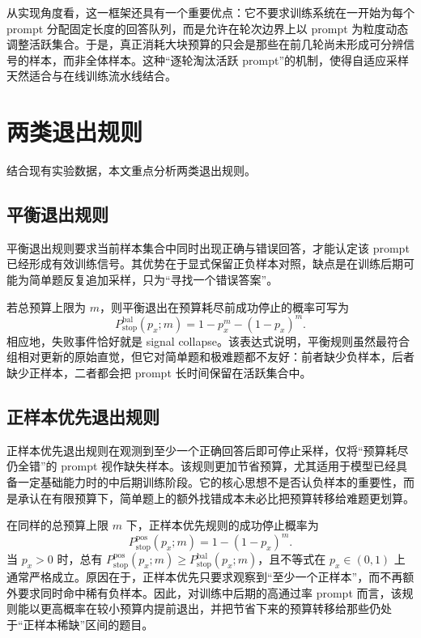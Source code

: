 从实现角度看，这一框架还具有一个重要优点：它不要求训练系统在一开始为每个 prompt 分配固定长度的回答队列，而是允许在轮次边界上以 prompt 为粒度动态调整活跃集合。于是，真正消耗大块预算的只会是那些在前几轮尚未形成可分辨信号的样本，而非全体样本。这种“逐轮淘汰活跃 prompt”的机制，使得自适应采样天然适合与在线训练流水线结合。

\section{两类退出规则}

结合现有实验数据，本文重点分析两类退出规则。

\subsection{平衡退出规则}

平衡退出规则要求当前样本集合中同时出现正确与错误回答，才能认定该 prompt 已经形成有效训练信号。其优势在于显式保留正负样本对照，缺点是在训练后期可能为简单题反复追加采样，只为“寻找一个错误答案”。

若总预算上限为 $m$，则平衡退出在预算耗尽前成功停止的概率可写为
\begin{equation}
    P_{\mathrm{stop}}^{\mathrm{bal}}(p_x;m)=1-p_x^m-(1-p_x)^m.
\end{equation}
相应地，失败事件恰好就是 signal collapse。该表达式说明，平衡规则虽然最符合组相对更新的原始直觉，但它对简单题和极难题都不友好：前者缺少负样本，后者缺少正样本，二者都会把 prompt 长时间保留在活跃集合中。
\subsection{正样本优先退出规则}

正样本优先退出规则在观测到至少一个正确回答后即可停止采样，仅将“预算耗尽仍全错”的 prompt 视作缺失样本。该规则更加节省预算，尤其适用于模型已经具备一定基础能力时的中后期训练阶段。它的核心思想不是否认负样本的重要性，而是承认在有限预算下，简单题上的额外找错成本未必比把预算转移给难题更划算。

在同样的总预算上限 $m$ 下，正样本优先规则的成功停止概率为
\begin{equation}
    P_{\mathrm{stop}}^{\mathrm{pos}}(p_x;m)=1-(1-p_x)^m.
\end{equation}
当 $p_x>0$ 时，总有 $P_{\mathrm{stop}}^{\mathrm{pos}}(p_x;m)\geq P_{\mathrm{stop}}^{\mathrm{bal}}(p_x;m)$，且不等式在 $p_x\in(0,1)$ 上通常严格成立。原因在于，正样本优先只要求观察到“至少一个正样本”，而不再额外要求同时命中稀有负样本。因此，对训练中后期的高通过率 prompt 而言，该规则能以更高概率在较小预算内提前退出，并把节省下来的预算转移给那些仍处于“正样本稀缺”区间的题目。

